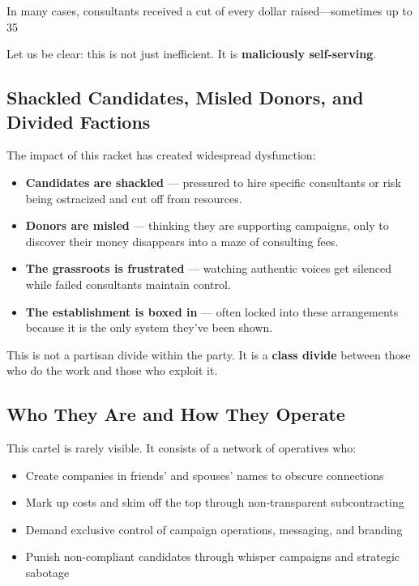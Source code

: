 In many cases, consultants received a cut of every dollar raised---sometimes up to 35%

Let us be clear: this is not just inefficient. It is \textbf{maliciously self-serving}.

\subsection{Shackled Candidates, Misled Donors, and Divided Factions}
The impact of this racket has created widespread dysfunction:
\begin{itemize}
\item \textbf{Candidates are shackled} --- pressured to hire specific consultants or risk being ostracized and cut off from resources.
\item \textbf{Donors are misled} --- thinking they are supporting campaigns, only to discover their money disappears into a maze of consulting fees.
\item \textbf{The grassroots is frustrated} --- watching authentic voices get silenced while failed consultants maintain control.
\item \textbf{The establishment is boxed in} --- often locked into these arrangements because it is the only system they’ve been shown.
\end{itemize}

This is not a partisan divide within the party. It is a \textbf{class divide} between those who do the work and those who exploit it.

\subsection{Who They Are and How They Operate}
This cartel is rarely visible. It consists of a network of operatives who:
\begin{itemize}
\item Create companies in friends' and spouses' names to obscure connections
\item Mark up costs and skim off the top through non-transparent subcontracting
\item Demand exclusive control of campaign operations, messaging, and branding
\item Punish non-compliant candidates through whisper campaigns and strategic sabotage
\end{itemize}

